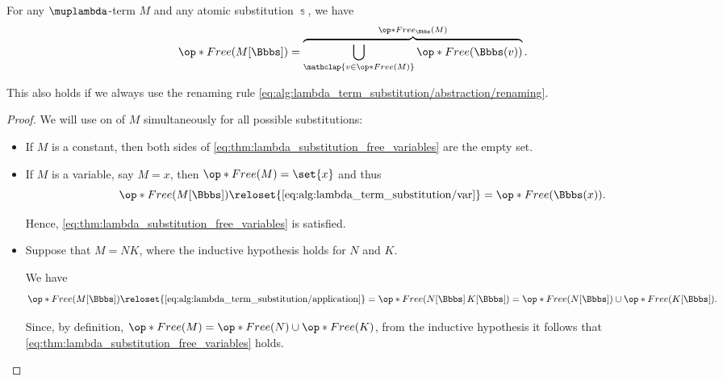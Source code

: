 \begin{proposition}\label{thm:lambda_substitution_free_variables}
  For any \( \muplambda \)-term \( M \) and any atomic substitution \( \Bbbs \), we have
  \begin{equation}\label{eq:thm:lambda_substitution_free_variables}
    \op*{Free}( M[\Bbbs] ) = \overbrace{\bigcup_{\mathclap{v \in \op*{Free}(M)}} \op*{Free}(\Bbbs(v))}^{\op*{Free}_\Bbbs(M)}.
  \end{equation}

  This also holds if we always use the renaming rule \eqref{eq:alg:lambda_term_substitution/abstraction/renaming}.
\end{proposition}
\begin{proof}
  We will use  on of \( M \) simultaneously for all possible substitutions:
  \begin{itemize}
    \item If \( M \) is a constant, then both sides of \eqref{eq:thm:lambda_substitution_free_variables} are the empty set.

    \item If \( M \) is a variable, say \( M = x \), then \( \op*{Free}(M) = \set{ x } \) and thus
    \begin{equation*}
      \op*{Free}(M[\Bbbs])
      \reloset {\eqref{eq:alg:lambda_term_substitution/var}} =
      \op*{Free}(\Bbbs(x)).
    \end{equation*}

    Hence, \eqref{eq:thm:lambda_substitution_free_variables} is satisfied.

    \item Suppose that \( M = NK \), where the inductive hypothesis holds for \( N \) and \( K \).

    We have
    \begin{equation*}
      \op*{Free}(M[\Bbbs])
      \reloset {\eqref{eq:alg:lambda_term_substitution/application}} =
      \op*{Free}(N[\Bbbs] \thinspace K[\Bbbs])
      =
      \op*{Free}(N[\Bbbs]) \cup \op*{Free}(K[\Bbbs]).
    \end{equation*}

    Since, by definition, \( \op*{Free}(M) = \op*{Free}(N) \cup \op*{Free}(K) \), from the inductive hypothesis it follows that \eqref{eq:thm:lambda_substitution_free_variables} holds.


\end{itemize}
\end{proof}
